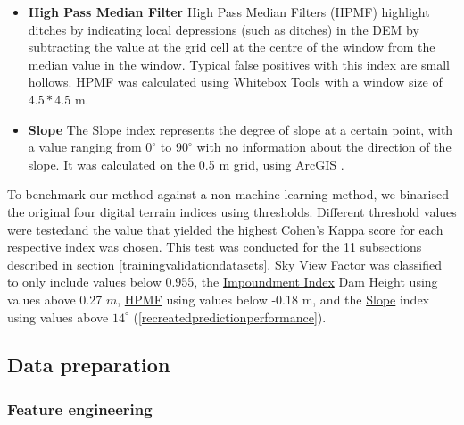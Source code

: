 \documentclass[11pt, review]{elsarticle} %
\providecommand{\DIFaddtex}[1]{{\protect\color{blue}\uwave{#1}}} %
\providecommand{\DIFaddbegin}{} %
\providecommand{\DIFaddend}{} %
\providecommand{\DIFdelbegin}{} %
\providecommand{\DIFdelend}{} %
\providecommand{\DIFadd}[1]{\texorpdfstring{\DIFaddtex{#1}}{#1}} %
\begin{document}
\begin{itemize}
  \item \textbf{High Pass Median Filter} \label{hpmf} \newline
    High Pass Median Filters (HPMF) highlight ditches by indicating local depressions (such as ditches) in the DEM by subtracting the value at the grid cell at the centre of the window from the median value in the window. Typical false positives with this index are small hollows. HPMF was calculated using Whitebox Tools \citep{whiteboxtools} with a window size of $4.5 * 4.5$ m. 

    \item \textbf{Slope} \label{slope} \newline
    The Slope index represents the degree of slope at a certain point, with a value ranging from $0^{\circ}$ to $90^{\circ}$ with no information about the direction of the slope. It was calculated on the 0.5 m grid, using ArcGIS \citep{EsriArcGisBook}.
\end{itemize}
\DIFdelbegin %

\DIFdelend \DIFaddbegin
\DIFaddend To benchmark our method against a non-machine learning method, we binarised the original four digital terrain indices using thresholds. Different threshold values were tested\DIFaddbegin \DIFadd{, }\DIFaddend and the value that yielded the highest Cohen's Kappa score for each respective index was chosen. This test was conducted for the 11 subsections described in \hyperref[trainingvalidationdatasets]{section} \ref{trainingvalidationdatasets}. \hyperref[skyviewfactor]{Sky View Factor} was classified to only include values below 0.955, the \hyperref[impoundment]{Impoundment Index} Dam Height using values above 0.27 $m$, \hyperref[hpmf]{HPMF} using values below -0.18 m, and the \hyperref[slope]{Slope} index using values above $14 ^{\circ}$ (\autoref{recreatedpredictionperformance}).

\subsection{Data preparation}

\subsubsection{Feature engineering}
\end{document}
